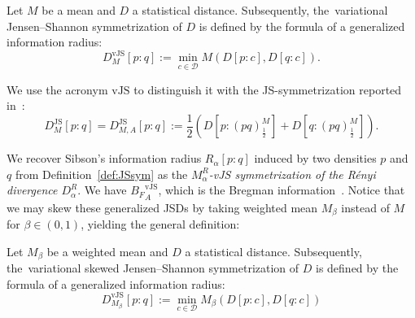 \documentclass[entropy,article,accept,oneauthor,pdftex,entropy]{Definitions/mdpi}
\def\vJS{\mathrm{vJS}}
\def\JS{\mathrm{JS}}
\def\calD{\mathcal{D}}
\begin{document}
\begin{paracol}{2}
\begin{Definition}\label{def:JSsym}
Let $M$ be a mean and $D$ a statistical distance. 
Subsequently, the~variational  Jensen--Shannon symmetrization of $D$ is defined by the formula of a generalized information radius:
$$
D^\vJS_{M}[p:q] := \min_{c\in\calD} M\left(D[p:c], D[q:c]\right).
$$
\end{Definition}

We use the acronym $\vJS$ to distinguish it with the JS-symmetrization reported in~\cite{JSsym-2019}:
$$
D^\JS_{M}[p:q] = D^\JS_{M,A}[p:q] := \frac{1}{2}\left(D\left[p:(pq)^M_{\frac{1}{2}}\right] + D\left[q:(pq)^M_{\frac{1}{2}}\right]\right).
$$

We recover Sibson's information radius   $R_\alpha[p:q]$ induced by two densities $p$ and $q$ from Definition~\ref{def:JSsym} as 
the {\em $M_\alpha^R$-vJS symmetrization of the R\'enyi divergence $D_\alpha^R$}. 
We have ${B_F}^\vJS_A$, which is the Bregman information~\cite{BregmanKmeans-2005}.
Notice that we may skew these generalized JSDs by taking weighted mean $M_\beta$ instead of $M$ for $\beta\in(0,1)$, yielding the general definition: 

\begin{Definition}\label{def:skewJSsym}
Let $M_\beta$ be a weighted mean and $D$ a statistical distance. 
Subsequently, the~variational  skewed Jensen--Shannon symmetrization of $D$ is defined by the formula of a generalized information radius:
$$
\boxed{D^\vJS_{M_\beta}[p:q] := \min_{c\in\calD} M_\beta\left(D[p:c], D[q:c]\right)}
$$
\end{Definition}

\begin{Example}


\end{Example}
\end{paracol}
\end{document}
